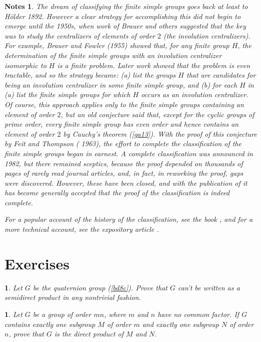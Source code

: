 \documentclass[a4paper,11pt,final,openany]{memoir}%
\newtheorem*{nt}{Notes}
\newtheorem{exercise}[Y]{}
\theoremstyle{nonumberplain}
\begin{document}
\begin{nt}
The dream of classifying the finite simple groups goes back at least to
H\"{o}lder 1892. However a clear strategy for accomplishing this did not begin
to emerge until the 1950s, when work of Brauer and others suggested that the
key was to study the centralizers of elements of order $2$ (the involution
centralizers). For example, Brauer and Fowler (1955)\nocite{brauer1955} showed
that, for any finite group $H$, the determination of the finite simple groups
with an involution centralizer isomorphic to $H$ is a finite problem. Later
work showed that the problem is even tractable, and so the strategy became:
(a) list the groups $H$ that are candidates for being an involution
centralizer in some finite simple group, and (b) for each $H$ in (a) list the
finite simple groups for which $H$ occurs as an involution centralizer.
\noindent Of course, this approach applies only to the finite simple groups
containing an element of order $2$, but an old conjecture said that, except
for the cyclic groups of prime order, every finite simple group has even order
and hence contains an element of order $2$ by Cauchy's theorem (\ref{ga13}).
With the proof of this conjecture by Feit and Thompson (\nocite{feit1963}%
1963), the effort to complete the classification of the finite simple groups
began in earnest. A complete classification was announced in 1982, but there
remained sceptics, because the proof depended on thousands of pages of rarely
read journal articles, and, in fact, in reworking the proof, gaps were
discovered. However, these have been closed, and with the publication of
\cite{aschbacher2004} it has become generally accepted that the proof of the
classification is indeed complete.

\label{solomon}For a popular account of the history of the classification, see
the book \cite{ronan2006}, and for a more technical account, see the
expository article \cite{solomon2001}.
\end{nt}

\section{Exercises}

\begin{exercise}
\label{x14} Let $G$ be the quaternion group (\ref{bd8c}). Prove that $G$ can't
be written as a semidirect product in any nontrivial fashion.
\end{exercise}

\begin{exercise}
\label{x15} Let $G$ be a group of order $mn$, where $m$ and $n$ have no common
factor. If $G$ contains exactly one subgroup $M$ of order $m$ and exactly one
subgroup $N$ of order $n$, prove that $G$ is the direct product of $M$ and $N$.
\end{exercise}
\end{document}
